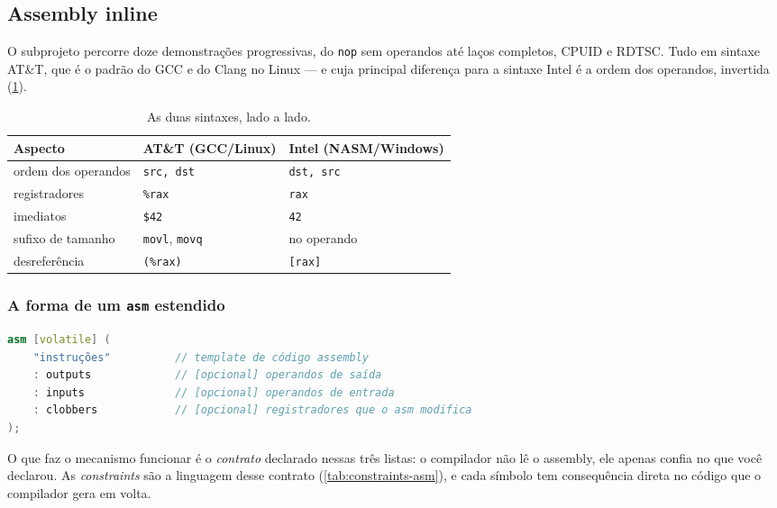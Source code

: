 \subsection{Assembly inline}
\label{sec:inline-asm}

O subprojeto  percorre doze demonstrações progressivas, do
\texttt{nop} sem operandos até laços completos, CPUID e RDTSC. Tudo em sintaxe
AT\&T, que é o padrão do GCC e do Clang no Linux --- e cuja principal diferença
para a sintaxe Intel é a ordem dos operandos, invertida
(\cref{tab:att-intel}).

\begin{table}[htbp]
\centering
\caption{As duas sintaxes, lado a lado.}
\label{tab:att-intel}
\footnotesize
\begin{tabular}{@{}lll@{}}
\toprule
\textbf{Aspecto} & \textbf{AT\&T (GCC/Linux)} & \textbf{Intel (NASM/Windows)} \\
\midrule
ordem dos operandos & \texttt{src, dst}        & \texttt{dst, src} \\
registradores       & \texttt{\%rax}           & \texttt{rax} \\
imediatos           & \texttt{\$42}            & \texttt{42} \\
sufixo de tamanho   & \texttt{movl}, \texttt{movq} & no operando \\
desreferência       & \texttt{(\%rax)}         & \texttt{[rax]} \\
\bottomrule
\end{tabular}
\end{table}

\subsubsection{A forma de um \texttt{asm} estendido}

\begin{lstlisting}[style=bt, language=C++,
    caption={As quatro seções, três delas opcionais.}]
asm [volatile] (
    "instruções"          // template de código assembly
    : outputs             // [opcional] operandos de saída
    : inputs              // [opcional] operandos de entrada
    : clobbers            // [opcional] registradores que o asm modifica
);
\end{lstlisting}

O que faz o mecanismo funcionar é o \emph{contrato} declarado nessas três
listas: o compilador não lê o assembly, ele apenas confia no que você declarou.
As \emph{constraints} são a linguagem desse contrato
(\cref{tab:constraints-asm}), e cada símbolo tem consequência direta no código
que o compilador gera em volta.


